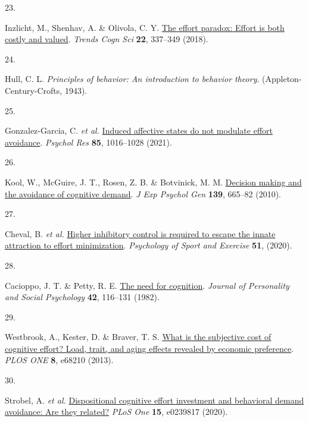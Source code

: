\documentclass[
  man,floatsintext]{apa6}
\newlength{\cslhangindent}
\newlength{\csllabelwidth}
\newlength{\cslentryspacingunit} %
\newenvironment{CSLReferences}[2] %
 {%
  \setlength{\parindent}{0pt}
  \ifodd #1
  \let\oldpar\par
  \def\par{\hangindent=\cslhangindent\oldpar}
  \fi
  \setlength{\parskip}{#2\cslentryspacingunit}
 }%
 {}
\newcommand{\CSLLeftMargin}[1]{\parbox[t]{\csllabelwidth}{#1}}
\newcommand{\CSLRightInline}[1]{\parbox[t]{\linewidth - \csllabelwidth}{#1}\break}
\begin{document}
\begin{CSLReferences}{0}{0}
\leavevmode{}%
\CSLLeftMargin{23. }%
\CSLRightInline{Inzlicht, M., Shenhav, A. \& Olivola, C. Y. \href{https://doi.org/10.1016/j.tics.2018.01.007}{The effort paradox: Effort is both costly and valued}. \emph{Trends Cogn Sci} \textbf{22}, 337--349 (2018).}

\leavevmode{}%
\CSLLeftMargin{24. }%
\CSLRightInline{Hull, C. L. \emph{Principles of behavior: An introduction to behavior theory}. (Appleton-Century-Crofts, 1943).}

\leavevmode{}%
\CSLLeftMargin{25. }%
\CSLRightInline{Gonzalez-Garcia, C. \emph{et al.} \href{https://doi.org/10.1007/s00426-020-01300-9}{Induced affective states do not modulate effort avoidance}. \emph{Psychol Res} \textbf{85}, 1016--1028 (2021).}

\leavevmode{}%
\CSLLeftMargin{26. }%
\CSLRightInline{Kool, W., McGuire, J. T., Rosen, Z. B. \& Botvinick, M. M. \href{https://doi.org/10.1037/a0020198}{Decision making and the avoidance of cognitive demand}. \emph{J Exp Psychol Gen} \textbf{139}, 665--82 (2010).}

\leavevmode{}%
\CSLLeftMargin{27. }%
\CSLRightInline{Cheval, B. \emph{et al.} \href{https://doi.org/ARTN\%20101781\%0A10.1016/j.psychsport.2020.101781}{Higher inhibitory control is required to escape the innate attraction to effort minimization}. \emph{Psychology of Sport and Exercise} \textbf{51}, (2020).}

\leavevmode{}%
\CSLLeftMargin{28. }%
\CSLRightInline{Cacioppo, J. T. \& Petty, R. E. \href{https://doi.org/10.1037//0022-3514.42.1.116}{The need for cognition}. \emph{Journal of Personality and Social Psychology} \textbf{42}, 116--131 (1982).}

\leavevmode{}%
\CSLLeftMargin{29. }%
\CSLRightInline{Westbrook, A., Kester, D. \& Braver, T. S. \href{https://doi.org/10.1371/journal.pone.0068210}{What is the subjective cost of cognitive effort? {Load}, trait, and aging effects revealed by economic preference}. \emph{PLOS ONE} \textbf{8}, e68210 (2013).}

\leavevmode{}%
\CSLLeftMargin{30. }%
\CSLRightInline{Strobel, A. \emph{et al.} \href{https://doi.org/10.1371/journal.pone.0239817}{Dispositional cognitive effort investment and behavioral demand avoidance: Are they related?} \emph{PLoS One} \textbf{15}, e0239817 (2020).}


\end{CSLReferences}
\end{document}
